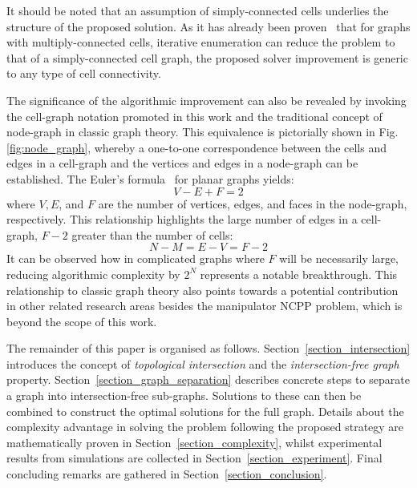 \documentclass[journal]{IEEEtran}
\begin{document}
It should be noted that an assumption of simply-connected cells underlies the structure of the proposed solution. As it has already been 
proven~\cite{Yang2020Nonrevisiting} %
that for graphs with multiply-connected cells, iterative enumeration can reduce the problem to that of a simply-connected cell graph, 
the proposed solver improvement is generic to any type of cell connectivity.


The significance of the algorithmic improvement can also be revealed by invoking the cell-graph notation promoted in this work and the traditional concept of node-graph in classic graph theory. This equivalence is pictorially shown in Fig.\ref{fig:node_graph}, whereby a one-to-one correspondence between the cells and edges in a cell-graph and the vertices and edges in a node-graph can be established. The Euler's formula~\cite{Bondy1976Graph} for planar graphs yields: 
\begin{equation}
V - E + F = 2
\end{equation}
where $V, E$, and $F$ are the number of vertices, edges, and faces in the node-graph, respectively. 
This relationship highlights the large number of edges in a cell-graph, $F-2$ greater than the number of cells: 
\begin{equation}
N - M = E - V = F - 2
\end{equation} 
It can be observed how in complicated graphs where $F$ will be necessarily large, reducing algorithmic complexity by $2^N$ represents a notable breakthrough. 
This relationship to classic graph theory also points towards a potential contribution in other related research areas besides the manipulator NCPP problem, which is beyond the scope of this work. 


The remainder of this paper is organised as follows. Section~\ref{section_intersection} introduces the concept of \textit{topological intersection} and the \textit{intersection-free graph} property.
Section~\ref{section_graph_separation} describes concrete steps to separate a graph into intersection-free sub-graphs. 
Solutions to these can then be combined to construct the optimal solutions for the full graph. 
Details about the complexity advantage in solving the problem following the proposed strategy are mathematically proven in Section~\ref{section_complexity}, whilst experimental results from simulations are collected in Section~\ref{section_experiment}. Final concluding remarks are gathered in Section~\ref{section_conclusion}.
\end{document}
